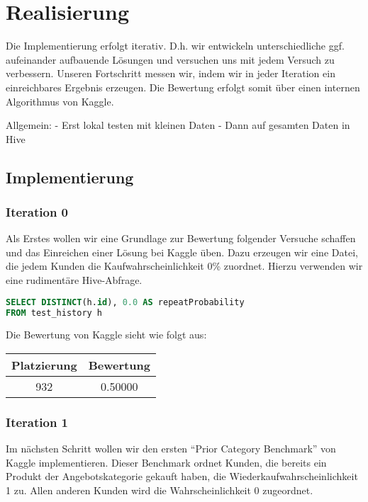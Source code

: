\section{Realisierung}

Die Implementierung erfolgt iterativ. D.h. wir entwickeln unterschiedliche ggf. aufeinander aufbauende Lösungen
und versuchen uns mit jedem Versuch zu verbessern. Unseren Fortschritt messen wir, indem wir in jeder
Iteration ein einreichbares Ergebnis erzeugen. Die Bewertung erfolgt somit über einen internen Algorithmus
von Kaggle.

Allgemein:
- Erst lokal testen mit kleinen Daten
- Dann auf gesamten Daten in Hive

\subsection{Implementierung}

\subsubsection{Iteration 0}

Als Erstes wollen wir eine Grundlage zur Bewertung folgender Versuche schaffen und das Einreichen einer
Lösung bei Kaggle üben. Dazu erzeugen wir eine Datei, die jedem Kunden die Kaufwahrscheinlichkeit 0\%
zuordnet. Hierzu verwenden wir eine rudimentäre Hive-Abfrage.

\begin{lstlisting}[language=SQL]
SELECT DISTINCT(h.id), 0.0 AS repeatProbability 
FROM test_history h
\end{lstlisting}

Die Bewertung von Kaggle sieht wie folgt aus:

\begin{tabular}{|c|c|}
	\hline \textbf{Platzierung} & \textbf{Bewertung} \\ 
	\hline 932 & 0.50000  \\ 
	\hline 
\end{tabular}

\subsubsection{Iteration 1}

Im nächsten Schritt wollen wir den ersten "`Prior Category Benchmark"' von Kaggle implementieren.
Dieser Benchmark ordnet Kunden, die bereits ein Produkt der Angebotskategorie gekauft haben, die
Wiederkaufwahrscheinlichkeit 1 zu. Allen anderen Kunden wird die Wahrscheinlichkeit 0 zugeordnet.

